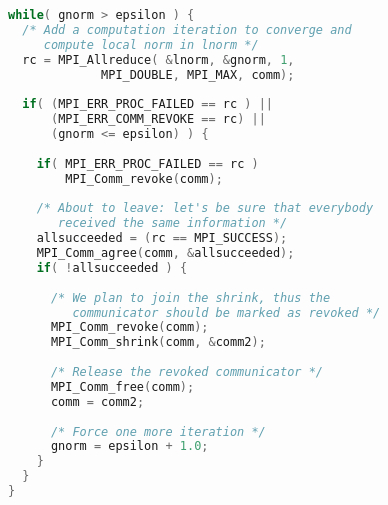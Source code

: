 \begin{lstlisting}[language=C,basicstyle=\ttfamily]
while( gnorm > epsilon ) {
  /* Add a computation iteration to converge and 
     compute local norm in lnorm */
  rc = MPI_Allreduce( &lnorm, &gnorm, 1, 
    	     MPI_DOUBLE, MPI_MAX, comm);
		
  if( (MPI_ERR_PROC_FAILED == rc ) ||
      (MPI_ERR_COMM_REVOKE == rc) ||
      (gnorm <= epsilon) ) {
			
    if( MPI_ERR_PROC_FAILED == rc )
        MPI_Comm_revoke(comm);
			
    /* About to leave: let's be sure that everybody 
       received the same information */
    allsucceeded = (rc == MPI_SUCCESS);
    MPI_Comm_agree(comm, &allsucceeded);
    if( !allsucceeded ) {
    
      /* We plan to join the shrink, thus the 
         communicator should be marked as revoked */           
      MPI_Comm_revoke(comm);
      MPI_Comm_shrink(comm, &comm2);
            
      /* Release the revoked communicator */
      MPI_Comm_free(comm); 
      comm = comm2;
            
      /* Force one more iteration */
      gnorm = epsilon + 1.0;
    }
  }
}
\end{lstlisting}

